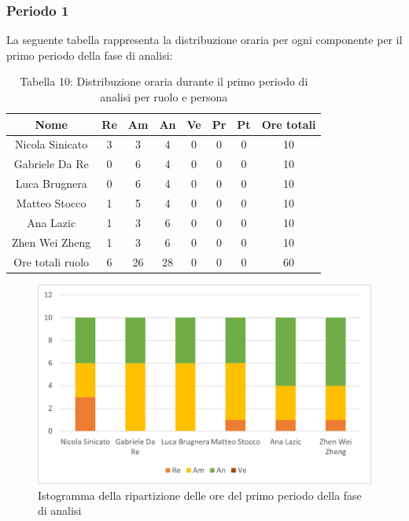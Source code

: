 \subsubsection{Periodo 1}
%
La seguente tabella rappresenta la distribuzione oraria per ogni componente per il primo periodo della fase di analisi:
\begin{table}[h]
	\setlength\extrarowheight{5pt}
	\centering
	\begin{tabularx}{\textwidth}{|ccccccc|c|}
		\hline
		\rowcolor{white}
		\textbf{Nome} & \textbf{Re} & \textbf{Am} & \textbf{An} & \textbf{Ve} & \textbf{Pr}& \textbf{Pt} & \textbf{Ore totali} \\
		\hline
		Nicola Sinicato &3&3&4&0&0&0&10 \\
		Gabriele Da Re &0&6&4&0&0&0&10 \\
		Luca Brugnera &0&6&4&0&0&0&10 \\
		Matteo Stocco &1&5&4&0&0&0&10 \\
		Ana Lazic &1&3&6&0&0&0&10 \\
		Zhen Wei Zheng &1&3&6&0&0&0&10 \\
		\hline
		Ore totali ruolo &6&26&28&0&0&0&60 \\
		\hline
	\end{tabularx}
	\vspace{10pt}
	\caption{Tabella 10: Distribuzione oraria durante il primo periodo di analisi per ruolo e persona}
\end{table}
\begin{figure}[H]
    \centering
    \includegraphics[scale=0.6]{img/grafi preventivo/istogrammi/analisi/periodo1.png}
    \caption{Istogramma della ripartizione delle ore del primo periodo della fase di analisi}
\end{figure}

